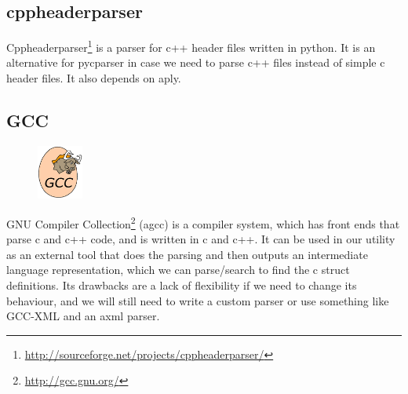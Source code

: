 \subsection{cppheaderparser}
Cppheaderparser\footnote{\url{http://sourceforge.net/projects/cppheaderparser/}}
is a \gls{parser} for \Gls{c++} \gls{header} files written in \Gls{python}. It is an alternative for
\gls{pycparser} in case we need to parse \Gls{c++} files instead of simple \Gls{c} \gls{header} files.
It also depends on \Gls{aply}.

\subsection{GCC}
\label{sec:pre:gcc}
\begin{figure}
	\vspace{-20pt}
	\includegraphics[width=1.5cm]{./planning/img/gcc_logo}
	\vspace{-20pt}
\end{figure}
GNU Compiler Collection\footnote{\url{http://gcc.gnu.org/}} (\Gls{agcc}) is a
compiler system, which has front ends that parse \Gls{c} and \Gls{c++} code, and is written
in \Gls{c} and \Gls{c++}. It can be used in our \gls{utility} as an external tool that does the
parsing and then outputs an intermediate language representation, which we can
parse/search to find the \Gls{c} \gls{struct} definitions. Its drawbacks are a lack of
flexibility if we need to change its behaviour, and we will still need to write
a custom \gls{parser} or use something like \gls{GCC-XML} and an \gls{axml} \gls{parser}.

